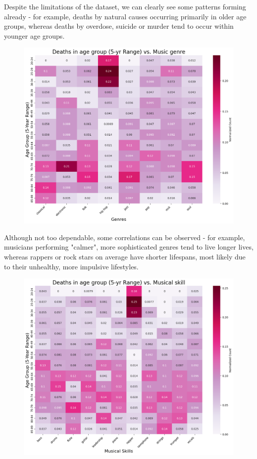 \documentclass{article}
\begin{document}
Despite the limitations of the dataset, we can clearly see some patterns forming already - for example, deaths by natural causes occurring primarily in older age groups, whereas deaths by overdose, suicide or murder tend to occur within younger age groups.

\begin{figure} [H]
    \centering
    \includegraphics[width=1\linewidth]{graph_images/heatmaps/age vs genre.png}
    \label{fig:enter-label}
\end{figure}

Although not too dependable, some correlations can be observed - for example, musicians performing "calmer", more sophisticated genres tend to live longer lives, whereas rappers or rock stars on average have shorter lifespans, most likely due to their unhealthy, more impulsive lifestyles.

\begin{figure} [H]
    \centering
    \includegraphics[width=1\linewidth]{graph_images/heatmaps/age vs musical skill.png}
    \label{fig:enter-label}
\end{figure}
\end{document}
